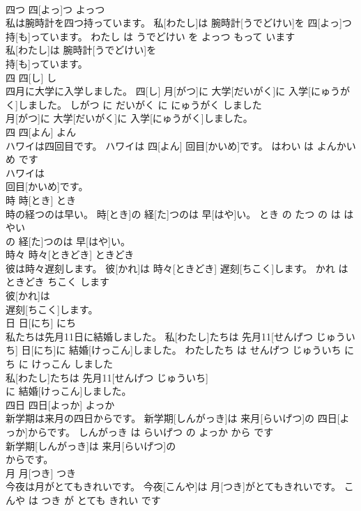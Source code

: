 \documentclass[8pt]{extreport}
\begin{document}
\begin{CJK}{UTF8}{min}
\\	四つ	四[よっ]つ	よっつ	
\\	私は腕時計を四つ持っています。	私[わたし]は 腕時計[うでどけい]を 四[よっ]つ 持[も]っています。	わたし は うでどけい を よっつ もって います	
\\	私[わたし]は 腕時計[うでどけい]を
\\	持[も]っています。			
\\	四	四[し]	し	
\\	四月に大学に入学しました。	四[し] 月[がつ]に 大学[だいがく]に 入学[にゅうがく]しました。	しがつ に だいがく に にゅうがく しました	
\\	月[がつ]に 大学[だいがく]に 入学[にゅうがく]しました。			
\\	四	四[よん]	よん	
\\	ハワイは四回目です。	ハワイは 四[よん] 回目[かいめ]です。	はわい は よんかいめ です	
\\	ハワイは
\\	回目[かいめ]です。			
\\	時	時[とき]	とき	
\\	時の経つのは早い。	時[とき]の 経[た]つのは 早[はや]い。	とき の たつ の は はやい	
\\	の 経[た]つのは 早[はや]い。			
\\	時々	時々[ときどき]	ときどき	
\\	彼は時々遅刻します。	彼[かれ]は 時々[ときどき] 遅刻[ちこく]します。	かれ は ときどき ちこく します	
\\	彼[かれ]は
\\	遅刻[ちこく]します。			
\\	日	日[にち]	にち	
\\	私たちは先月11日に結婚しました。	私[わたし]たちは 先月11[せんげつ じゅういち] 日[にち]に 結婚[けっこん]しました。	わたしたち は せんげつ じゅういち にち に けっこん しました	
\\	私[わたし]たちは 先月11[せんげつ じゅういち]
\\	に 結婚[けっこん]しました。			
\\	四日	四日[よっか]	よっか	
\\	新学期は来月の四日からです。	新学期[しんがっき]は 来月[らいげつ]の 四日[よっか]からです。	しんがっき は らいげつ の よっか から です	
\\	新学期[しんがっき]は 来月[らいげつ]の
\\	からです。			
\\	月	月[つき]	つき	
\\	今夜は月がとてもきれいです。	今夜[こんや]は 月[つき]がとてもきれいです。	こんや は つき が とても きれい です	

\end{CJK}
\end{document}

